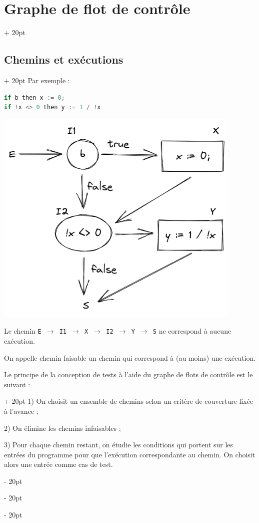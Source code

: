 \documentclass[a4paper, 12pt, twoside]{article}
\newcommand{\ind}[1][20pt]{\advance\leftskip + #1}
\newcommand{\deind}[1][20pt]{\advance\leftskip - #1}
\newenvironment{indentedenv}[1][20pt]{\par \ind[#1]}{\par \deind}
\newenvironment{indt}[2][20pt]{#2 \begin{indentedenv}[#1]}{\end{indentedenv}} %
\begin{document}
\begin{indt}{\section{Graphe de flot de contrôle}}
\begin{indt}{\subsection{Chemins et exécutions}}
            Par exemple :
            
            \begin{lstlisting}[language=C, xleftmargin=60pt]
if b then x := 0;
if !x <> 0 then y := 1 / !x\end{lstlisting}
            
            \begin{center}
                \includegraphics[scale=.4]{draw/draw2.png}
            \end{center}
            
            Le chemin \texttt{E $\rightarrow$ I1 $\rightarrow$ X $\rightarrow$ I2 $\rightarrow$ Y $\rightarrow$ S} ne correspond à aucune exécution.
            
            \vspace{12pt}
            
            On appelle chemin faisable un chemin qui correspond à (au moins) une exécution.
            
            \begin{indt}{Le principe de la conception de tests à l'aide du graphe de flots de contrôle est le suivant :}
                1) On choisit un ensemble de chemins selon un critère de couverture fixée à l'avance ;
                
                2) On élimine les chemins infaisables ;
                
                3) Pour chaque chemin restant, on étudie les conditions qui portent sur les entrées du programme pour que l'exécution correspondante au chemin. On choisit alors une entrée comme cas de test.
            \end{indt}
        \end{indt}
        

\end{indt}
\end{document}
